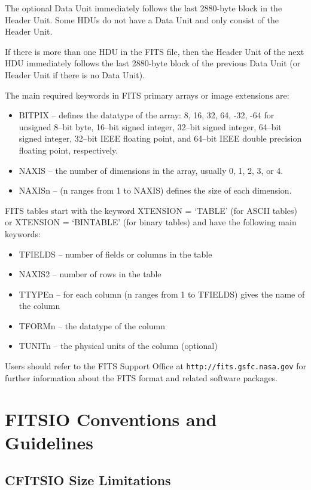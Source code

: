 \documentclass[11pt]{book}
\begin{document}
The optional Data Unit immediately follows the last 2880-byte block in
the Header Unit.  Some HDUs do not have a Data Unit and only consist of
the Header Unit.

If there is more than one HDU in the FITS file, then the Header Unit of
the next HDU immediately follows the last 2880-byte block of the
previous Data Unit (or Header Unit if there is no Data Unit).

The main required keywords in FITS primary arrays or image extensions are:
\begin{itemize}
\item
BITPIX -- defines the datatype of the array: 8, 16, 32, 64, -32, -64 for
unsigned 8--bit byte, 16--bit signed integer, 32--bit signed integer,
64--bit signed integer,
32--bit IEEE floating point, and 64--bit IEEE double precision floating
point, respectively.
\item
NAXIS --  the number of dimensions in the array, usually 0, 1, 2, 3, or 4.
\item
NAXISn -- (n ranges from 1 to NAXIS) defines the size of each dimension.
\end{itemize}

FITS tables start with the keyword XTENSION = `TABLE' (for ASCII
tables) or XTENSION = `BINTABLE' (for binary tables) and have the
following main keywords:
\begin{itemize}
\item
TFIELDS -- number of fields or columns in the table
\item
NAXIS2 -- number of rows in the table
\item
TTYPEn -- for each column (n ranges from 1 to TFIELDS) gives the
name of the column
\item
TFORMn -- the datatype of the column
\item
TUNITn -- the physical units of the column (optional)
\end{itemize}

Users should refer to the FITS Support Office at {\tt http://fits.gsfc.nasa.gov}
for further information about the FITS format and related software
packages.



\chapter{FITSIO Conventions and Guidelines }


\section{CFITSIO Size Limitations}
\end{document}
